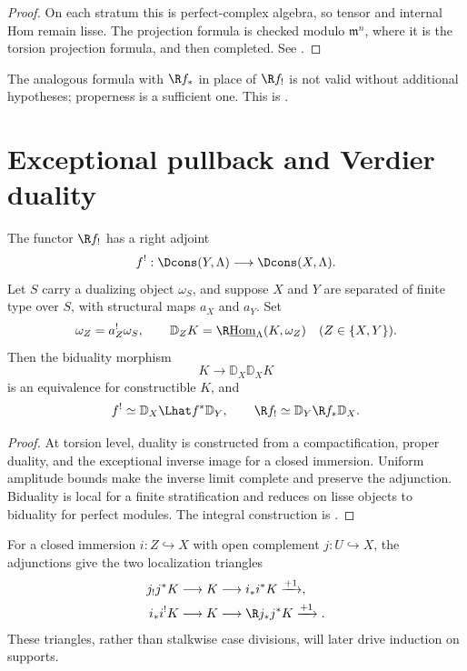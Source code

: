 \begin{proof}
On each stratum this is perfect-complex algebra, so tensor and internal Hom
remain lisse.  The projection formula is checked modulo
\(\mathfrak m^n\), where it is the torsion projection formula, and then
completed.  See \cite[Lemmas~6.7.12--6.7.14]{BhattScholzeProEtale}.
\end{proof}

\begin{warning}
The analogous formula with \(\R f_*\) in place of \(\R f_!\) is not valid
without additional hypotheses; properness is a sufficient one.  This is
\cite[Remark~6.7.15]{BhattScholzeProEtale}.
\end{warning}

\section{Exceptional pullback and Verdier duality}

\begin{theorem}[Existence of \(f^!\)]
\label{thm:proetale-fupper-shriek}
The functor \(\R f_!\) has a right adjoint
\[
 f^!:\Dcons(Y,\Lambda)\longrightarrow\Dcons(X,\Lambda).
\]
Let \(S\) carry a dualizing object \(\omega_S\), and suppose \(X\) and
\(Y\) are separated of finite type over \(S\), with structural maps
\(a_X\) and \(a_Y\).  Set
\[
 \omega_Z=a_Z^!\omega_S,
 \qquad
 \mathbb D_ZK=
 \R\underline{\operatorname{Hom}}_{\Lambda}(K,\omega_Z)
 \quad(Z\in\{X,Y\}).
\]
Then the biduality morphism
\[
 K\longrightarrow\mathbb D_X\mathbb D_XK
\]
is an equivalence for constructible \(K\), and
\begin{equation}
\label{eq:six-duality-identities}
 f^!\simeq\mathbb D_X\Lhat f^*\mathbb D_Y,
 \qquad
 \R f_!\simeq\mathbb D_Y\R f_*\mathbb D_X.
\end{equation}
\end{theorem}

\begin{proof}
At torsion level, duality is constructed from a compactification, proper
duality, and the exceptional inverse image for a closed immersion.  Uniform
amplitude bounds make the inverse limit complete and preserve the adjunction.
Biduality is local for a finite stratification and reduces on lisse objects
to biduality for perfect modules.  The integral construction is
\cite[Lemmas~6.7.11 and 6.7.19--6.7.20]{BhattScholzeProEtale}.
\end{proof}

For a closed immersion \(i:Z\hookrightarrow X\) with open complement
\(j:U\hookrightarrow X\), the adjunctions give the two localization triangles
\begin{align*}
 j_!j^*K&\longrightarrow K\longrightarrow i_*i^*K\xrightarrow{+1}, \\
 i_*i^!K&\longrightarrow K\longrightarrow\R j_*j^*K\xrightarrow{+1}.
\end{align*}
These triangles, rather than stalkwise case divisions, will later drive
induction on supports.

